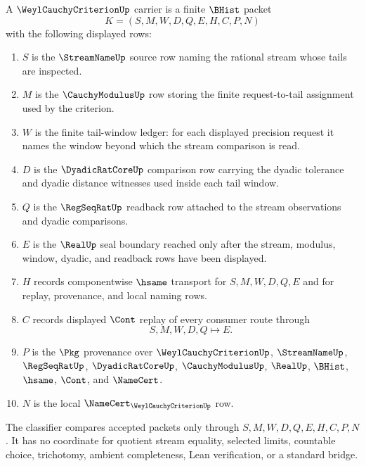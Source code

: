 \begin{definition}
\label{def:weyl-cauchy-criterion-carrier}
A $\WeylCauchyCriterionUp$ carrier is a finite $\BHist$ packet
$$
K=(S,M,W,D,Q,E,H,C,P,N)
$$
with the following displayed rows:
\begin{enumerate}
\item $S$ is the $\StreamNameUp$ source row naming the rational stream whose tails are inspected.
\item $M$ is the $\CauchyModulusUp$ row storing the finite request-to-tail assignment used by the criterion.
\item $W$ is the finite tail-window ledger: for each displayed precision request it names the window beyond which the stream comparison is read.
\item $D$ is the $\DyadicRatCoreUp$ comparison row carrying the dyadic tolerance and dyadic distance witnesses used inside each tail window.
\item $Q$ is the $\RegSeqRatUp$ readback row attached to the stream observations and dyadic comparisons.
\item $E$ is the $\RealUp$ seal boundary reached only after the stream, modulus, window, dyadic, and readback rows have been displayed.
\item $H$ records componentwise $\hsame$ transport for $S,M,W,D,Q,E$ and for replay, provenance, and local naming rows.
\item $C$ records displayed $\Cont$ replay of every consumer route through
$$
S,M,W,D,Q \longmapsto E .
$$
\item $P$ is the $\Pkg$ provenance over $\WeylCauchyCriterionUp$, $\StreamNameUp$, $\RegSeqRatUp$, $\DyadicRatCoreUp$, $\CauchyModulusUp$, $\RealUp$, $\BHist$, $\hsame$, $\Cont$, and $\NameCert$.
\item $N$ is the local $\NameCert_{\WeylCauchyCriterionUp}$ row.
\end{enumerate}
The classifier compares accepted packets only through $S,M,W,D,Q,E,H,C,P,N$. It has no coordinate for quotient stream equality, selected limits, countable choice, trichotomy, ambient completeness, Lean verification, or a standard bridge.
\end{definition}

